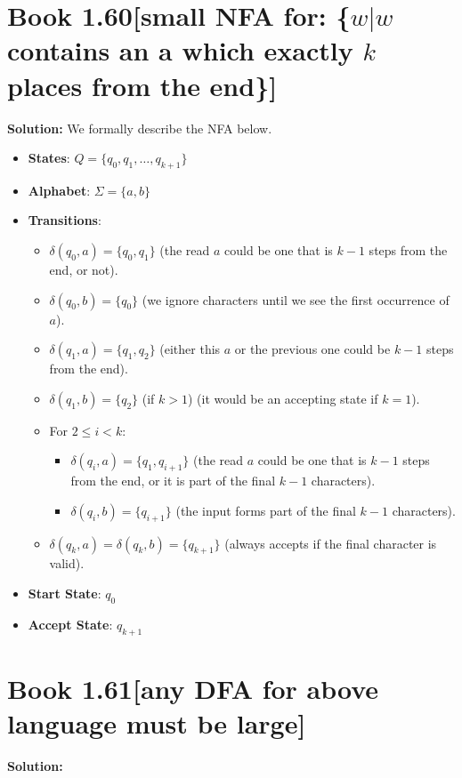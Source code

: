 \documentclass[11pt]{article}
\newenvironment{question}[2]
{\newpage\section{#1\texorpdfstring{\hfill}{horizontal spacing}{\rm\normalsize #2}}}{}
\newenvironment{solution}
{\textbf{Solution: }\color{blue}}
{\color{black}}
\begin{document}
\begin{question}{Book 1.60}{[small NFA for: \{\(w | w\) contains an \textbf{a} which exactly \(k\) places from the end\}]}
\begin{solution}
We formally describe the NFA below.
\begin{itemize}
    \item \textbf{States}: \(Q=\{q_0,q_1,\ldots,q_{k+1}\}\)
    \item \textbf{Alphabet}: \(\Sigma = \{a,b\}\)
    \item \textbf{Transitions}:
    \begin{itemize}
        \item \(\delta(q_0,a) = \{q_0, q_1\}\) (the read \(a\) could be one that is \(k-1\) steps from the end, or not).
        \item \(\delta(q_0,b) = \{q_0\}\) (we ignore characters until we see the first occurrence of \(a\)).
        \item \(\delta(q_1,a) = \{q_1,q_2\}\) (either this \(a\) or the previous one could be \(k-1\) steps from the end).
        \item \(\delta(q_1,b) = \{q_2\}\) (if \(k>1\)) (it would be an accepting state if \(k=1\)).
        \item For \(2 \leq i < k\):
        \begin{itemize}
            \item \(\delta(q_i,a)=\{q_1,q_{i+1}\}\) (the read \(a\) could be one that is \(k-1\) steps from the end, or it is part of the final \(k-1\) characters).
            \item \(\delta(q_i,b)=\{q_{i+1}\}\) (the input forms part of the final \(k-1\) characters).
        \end{itemize}
        \item \(\delta(q_k,a)= \delta(q_k,b) = \{q_{k+1}\}\) (always accepts if the final character is valid).
    \end{itemize}
    \item \textbf{Start State}: \(q_0\)
    \item \textbf{Accept State}: \(q_{k+1}\)
\end{itemize}

\end{solution}
\end{question}


\begin{question}{Book 1.61}{[any DFA for above language must be large]}


\begin{solution}

\end{solution}
\end{question}
\end{document}
